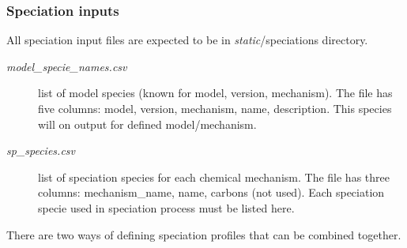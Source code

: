 \documentclass[a4paper,11pt]{article}
\begin{document}
\subsubsection{Speciation inputs}\label{speciation-inputs}

All speciation input files are expected to be in
\emph{static}/speciations directory.

\begin{description}
\item[\emph{model\_specie\_names.csv}]
list of model species (known for model, version, mechanism). The file
has five columns: model, version, mechanism, name, description. This
species will on output for defined model/mechanism.
\item[\emph{sp\_species.csv}]
list of speciation species for each chemical mechanism. The file has
three columns: mechanism\_name, name, carbons (not used). Each
speciation specie used in speciation process must be listed here.
\end{description}

There are two ways of defining speciation profiles that can be combined
together.
\end{document}
